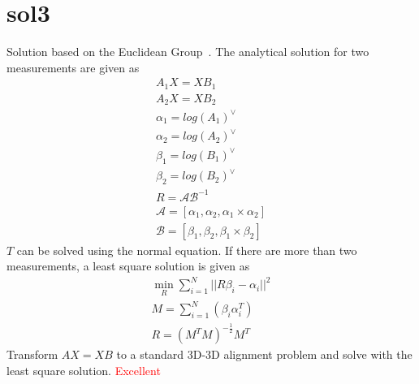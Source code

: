 \section{sol3}
Solution based on the Euclidean Group~\cite{park1994robot}. The analytical solution for two measurements are given as
\begin{align}
A_1 X = X B_1 \nonumber \\
A_2 X = X B_2 \nonumber \\
\alpha_1 = log(A_1)^{\vee} \nonumber \\
\alpha_2 = log(A_2)^{\vee} \nonumber \\
\beta_1 = log(B_1)^{\vee} \nonumber \\
\beta_2 = log(B_2)^{\vee} \nonumber \\
R = \mathcal{A}\mathcal{B}^{-1} \\
\mathcal{A}=\left[ \alpha_1,\alpha_2, \alpha_1 \times \alpha_2 \right] \nonumber \\
\mathcal{B}=\left[ \beta_1,\beta_2, \beta_1 \times \beta_2 \right] \nonumber
\end{align}
$T$ can be solved using the normal equation. If there are more than two measurements, a least square solution is given as
\begin{align}
\min_{R} \sum_{i=1}^{N} || R\beta_i-\alpha_i ||^2 \\
M = \sum_{i=1}^{N} (\beta_i\alpha_i^T) \\
R = (M^TM)^{-\frac{1}{2}}M^T
\end{align}
Transform $AX=XB$ to a standard 3D-3D alignment problem and solve with the least square solution. \textcolor{red}{Excellent}

